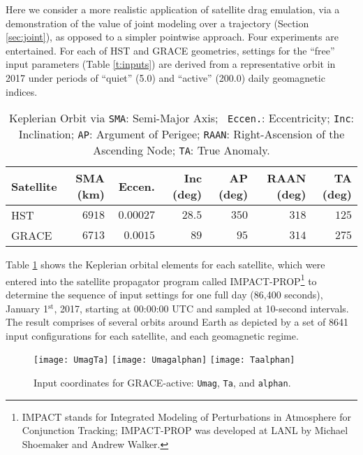 \documentclass[12pt]{article}
\begin{document}
Here we consider a more realistic application of satellite drag emulation, via
a demonstration of the value of joint modeling over a trajectory (Section
\ref{sec:joint}), as opposed to a simpler pointwise approach.  Four experiments
are entertained. For each of HST and GRACE geometries, settings for the
``free'' input parameters (Table \ref{t:inputs}) are derived from a
representative orbit in 2017 under periods of ``quiet'' (5.0) and ``active''
(200.0) daily geomagnetic indices.
\begin{table}[ht!]
\small
\centering
\begin{tabular}{l|rrrrrr}
{\bfseries Satellite} & {\bfseries SMA (km) } & {\bfseries Eccen.} & {\bfseries Inc (deg)} & 
{\bfseries AP (deg)} & {\bfseries RAAN (deg)} & {\bfseries TA (deg)} \\ 
  \hline
HST & $\ 6918$ & $\ 0.00027$ & $\quad 28.5$ & $\quad 350$ & $\quad 318$ & $\quad 125$ \\ 
  GRACE & $\ 6713$ & $\ 0.0015$ & $\quad 89$ & $\quad 95$ & $\quad 314$ & $\quad 275$ 
\end{tabular}
\caption{Keplerian Orbit via {\tt SMA}: Semi-Major Axis; {\tt
Eccen.}: Eccentricity; {\tt Inc}: Inclination; {\tt AP}: Argument of Perigee;
{\tt RAAN}: Right-Ascension of the Ascending Node; {\tt TA}: True Anomaly.}
\label{t:UQ_oe}
\end{table}
Table \ref{t:UQ_oe} shows the Keplerian orbital elements for each satellite,
which were entered into the satellite propagator program called
IMPACT-PROP\footnote{IMPACT stands for Integrated Modeling of Perturbations in
Atmosphere for Conjunction Tracking; IMPACT-PROP was developed at LANL
by Michael Shoemaker and Andrew Walker.} to determine the sequence of input
settings for one full day (86,400 seconds), January 1$^\mathrm{st}$, 2017,
starting at 00:00:00 UTC and sampled at 10-second intervals. The result
comprises of several orbits around Earth as depicted by a set of 8641 input
configurations for each satellite, and each geomagnetic regime.

\begin{figure}[ht!]
\centering
\texttt{[image: UmagTa]}
\texttt{[image: Umagalphan]}
\texttt{[image: Taalphan]}
\vspace{-0.25cm}
\caption{Input coordinates for GRACE-active: {\tt Umag}, {\tt Ta}, and {\tt alphan}.}
\label{f:UQ_par}
\end{figure}
\end{document}
